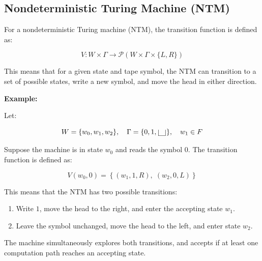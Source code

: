 \documentclass[12pt,a4paper,openany]{article}
\begin{document}
\subsection{Nondeterministic Turing Machine (NTM)}

For a nondeterministic Turing machine (NTM), the transition function is defined as:

\[V: W \times \Gamma \to \mathcal{P}(W \times \Gamma \times \{L, R\})\]

This means that for a given state and tape symbol, the NTM can transition to a set of possible states, write a new symbol, and move the head in either direction.

\textbf{Example:}

Let:

\[
W = \{w_0, w_1, w_2\}, \quad \Gamma = \{0, 1, \scalebox{2.5}{\textvisiblespace}\}, \quad w_1 \in F
\]

Suppose the machine is in state $w_0$ and reads the symbol $0$. The transition
function is defined as:

\[
V(w_0, 0) =
\left\{
(w_1, 1, R),\;
(w_2, 0, L)
\right\}
\]

This means that the NTM has two possible transitions:

\begin{enumerate}
  \item Write $1$, move the head to the right, and enter the accepting state $w_1$.
  \item Leave the symbol unchanged, move the head to the left, and enter state $w_2$.
\end{enumerate}

The machine simultaneously explores both transitions, and accepts if at least one
computation path reaches an accepting state.
\end{document}

